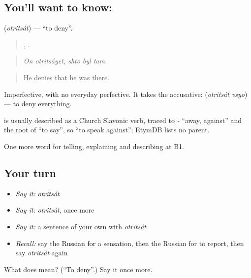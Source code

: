 \subsection*{You'll want to know: }
\textbf{} (\emph{otritsát}) — \textquotedblleft{}to deny\textquotedblright{}.

\begin{quote}
 ,   .
\end{quote}

\begin{quote}
\emph{On otritsáyet, shto byl tam.}
\end{quote}

\begin{quote}
He denies that he was there.
\end{quote}

Imperfective, with no everyday perfective. It takes the accusative: \emph{ } (\emph{otritsát vsyo}) — to deny everything.

\begin{cousinweb}
\emph{} is usually described as a Church Slavonic verb, traced to \emph{-} \textquotedblleft{}away, against\textquotedblright{} and the root of \emph{} \textquotedblleft{}to say\textquotedblright{}, so \textquotedblleft{}to speak against\textquotedblright{}; EtymDB lists no parent.
\end{cousinweb}

\begin{grammarlens}[title={What you've built}]
One more word for telling, explaining and describing at B1.
\end{grammarlens}

\subsection*{Your turn}
\begin{itemize}
\raggedright
  \item \emph{Say it:} \emph{otritsát}
  \item \emph{Say it:} \emph{otritsát}, once more
  \item \emph{Say it:} a sentence of your own with \emph{otritsát}
  \item \emph{Recall:} say the Russian for a sensation, then the Russian for to report, then say \emph{otritsát} again
\end{itemize}

\begin{tcolorbox}[breakable,colback=teal!4,colframe=teal!35!black,title={Before you move on}]
What does  mean? (\textquotedblleft{}To deny\textquotedblright{}.) Say it once more.
\end{tcolorbox}
